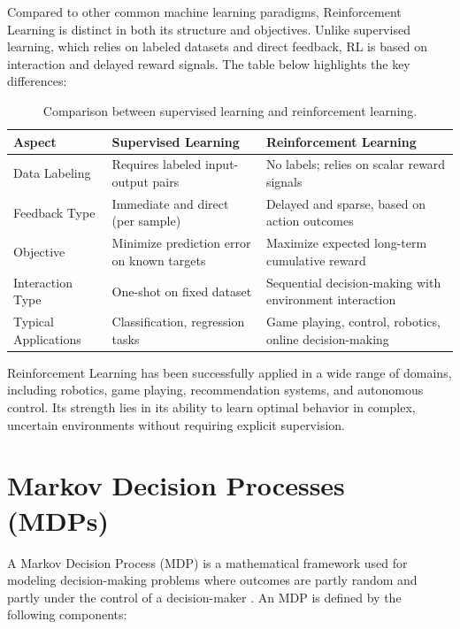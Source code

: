 \documentclass[../Main.tex]{subfiles}
\begin{document}
Compared to other common machine learning paradigms, Reinforcement Learning is distinct in both its structure and objectives. Unlike supervised learning, which relies on labeled datasets and direct feedback, RL is based on interaction and delayed reward signals. The table below highlights the key differences:

\begin{table}[H]
\centering
\small
\renewcommand{\arraystretch}{1.2}
\begin{tabular}{|p{3.2cm}|p{5cm}|p{5cm}|}
    \hline
    \textbf{Aspect} & \textbf{Supervised Learning} & \textbf{Reinforcement Learning} \\
    \hline
    Data Labeling & Requires labeled input-output pairs & No labels; relies on scalar reward signals \\
    \hline
    Feedback Type & Immediate and direct (per sample) & Delayed and sparse, based on action outcomes \\
    \hline
    Objective & Minimize prediction error on known targets & Maximize expected long-term cumulative reward \\
    \hline
    Interaction Type & One-shot on fixed dataset & Sequential decision-making with environment interaction \\
    \hline
    Typical Applications & Classification, regression tasks & Game playing, control, robotics, online decision-making \\
    \hline
\end{tabular}
\caption{Comparison between supervised learning and reinforcement learning.}
\label{tab:supervised-vs-rl}
\end{table}


Reinforcement Learning has been successfully applied in a wide range of domains, including robotics, game playing, recommendation systems, and autonomous control. Its strength lies in its ability to learn optimal behavior in complex, uncertain environments without requiring explicit supervision.


\section{Markov Decision Processes (MDPs)}

A Markov Decision Process (MDP) is a mathematical framework used for modeling decision-making problems where outcomes are partly random and partly under the control of a decision-maker \cite{bellman1957dynamic}. An MDP is defined by the following components:
\end{document}
